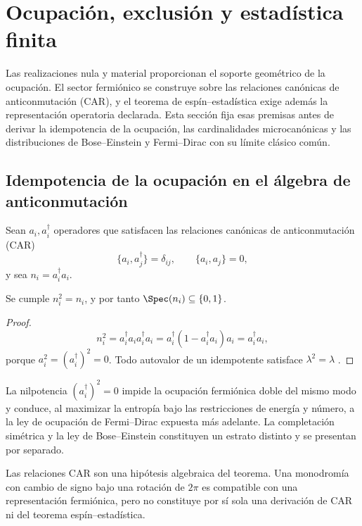 \section{Ocupación, exclusión y estadística finita}
\label{chap:ocupacion-estadistica}

Las realizaciones nula y material proporcionan el soporte geométrico de la
ocupación. El sector fermiónico se construye sobre las relaciones canónicas de
anticonmutación (CAR), y el teorema de espín--estadística exige además la
representación operatoria declarada. Esta sección fija esas premisas antes de
derivar la idempotencia de la ocupación, las cardinalidades microcanónicas y
las distribuciones de Bose--Einstein y Fermi--Dirac con su límite clásico
común.

\subsection{Idempotencia de la ocupación en el álgebra de anticonmutación}

Sean \(a_i,a_i^\dagger\) operadores que satisfacen las relaciones canónicas
de anticonmutación (CAR)
\[
 \{a_i,a_j^\dagger\}=\delta_{ij},
 \qquad \{a_i,a_j\}=0,
\]
y sea \(n_i=a_i^\dagger a_i\).

\begin{theorem}
\label{thm:principio-exclusion-pauli}
Se cumple \(n_i^2=n_i\), y por tanto
\(\Spec(n_i)\subseteq\{0,1\}\).
\end{theorem}
\begin{proof}
\[
 n_i^2=a_i^\dagger a_i a_i^\dagger a_i
 =a_i^\dagger(1-a_i^\dagger a_i)a_i
 =a_i^\dagger a_i,
\]
porque \(a_i^2=(a_i^\dagger)^2=0\). Todo autovalor de un idempotente
satisface \(\lambda^2=\lambda\) \cite{Pauli1925,Dirac1926}.
\end{proof}

La nilpotencia \((a_i^\dagger)^2=0\) impide la ocupación fermiónica doble del
mismo modo y conduce, al maximizar la entropía bajo las restricciones de
energía y número, a la ley de ocupación de Fermi--Dirac expuesta más adelante.
La completación simétrica y la ley de Bose--Einstein constituyen un estrato
distinto y se presentan por separado.

Las relaciones CAR son una hipótesis algebraica del teorema. Una monodromía
con cambio de signo bajo una rotación de \(2\pi\) es compatible con una
representación fermiónica, pero no constituye por sí sola una derivación de
CAR ni del teorema espín--estadística.
